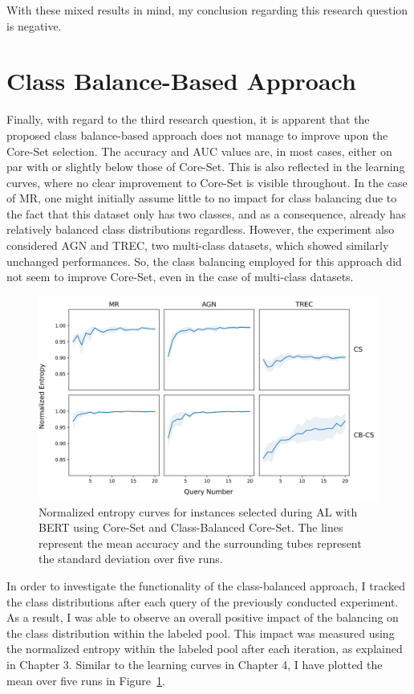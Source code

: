 \documentclass[english,bachelor,ul]{webisthesis} %
\begin{document}
With these mixed results in mind, my conclusion regarding this research question is negative.

\section{Class Balance-Based Approach}

Finally, with regard to the third research question, it is apparent that the proposed class balance-based approach does not manage to improve upon the Core-Set selection. The accuracy and AUC values are, in most cases, either on par with or slightly below those of Core-Set. This is also reflected in the learning curves, where no clear improvement to Core-Set is visible throughout. In the case of MR, one might initially assume little to no impact for class balancing due to the fact that this dataset only has two classes, and as a consequence, already has relatively balanced class distributions regardless. However, the experiment also considered AGN and TREC, two multi-class datasets, which showed similarly unchanged performances. So, the class balancing employed for this approach did not seem to improve Core-Set, even in the case of multi-class datasets.

\begin{figure}[htbp]
    \centering
    \includegraphics[scale=0.55]{img/entropy_plots_new-1.png}
    \caption{Normalized entropy curves for instances selected during AL with BERT using Core-Set and Class-Balanced Core-Set. The lines represent the mean accuracy and the surrounding tubes represent the standard deviation over five runs.}
    \label{fig:entropy-plot}
\end{figure}

In order to investigate the functionality of the class-balanced approach, I tracked the class distributions after each query of the previously conducted experiment. As a result, I was able to observe an overall positive impact of the balancing on the class distribution within the labeled pool. This impact was measured using the normalized entropy within the labeled pool after each iteration, as explained in Chapter 3. Similar to the learning curves in Chapter 4, I have plotted the mean over five runs in Figure~\ref{fig:entropy-plot}. 
\end{document}
